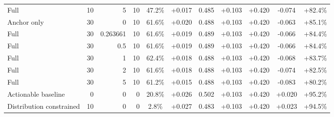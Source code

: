\begin{table}[htbp]
\begin{tabular}{lrrrccccccc}
Full & 10 & 5 & 10 & 47.2\% & +0.017 & 0.485 & +0.103 & +0.420 & -0.074 & +82.4\% \\
Anchor only & 30 & 0 & 10 & 61.6\% & +0.020 & 0.488 & +0.103 & +0.420 & -0.063 & +85.1\% \\
Full & 30 & 0.263661 & 10 & 61.6\% & +0.019 & 0.489 & +0.103 & +0.420 & -0.066 & +84.4\% \\
Full & 30 & 0.5 & 10 & 61.6\% & +0.019 & 0.489 & +0.103 & +0.420 & -0.066 & +84.4\% \\
Full & 30 & 1 & 10 & 62.4\% & +0.018 & 0.488 & +0.103 & +0.420 & -0.068 & +83.7\% \\
Full & 30 & 2 & 10 & 61.6\% & +0.018 & 0.488 & +0.103 & +0.420 & -0.074 & +82.5\% \\
Full & 30 & 5 & 10 & 61.2\% & +0.015 & 0.488 & +0.103 & +0.420 & -0.083 & +80.2\% \\
Actionable baseline & 0 & 0 & 0 & 20.8\% & +0.026 & 0.502 & +0.103 & +0.420 & +0.020 & +95.2\% \\
Distribution constrained & 10 & 0 & 0 & 2.8\% & +0.027 & 0.483 & +0.103 & +0.420 & +0.023 & +94.5\% \\
\bottomrule
\end{tabular}
\end{table}